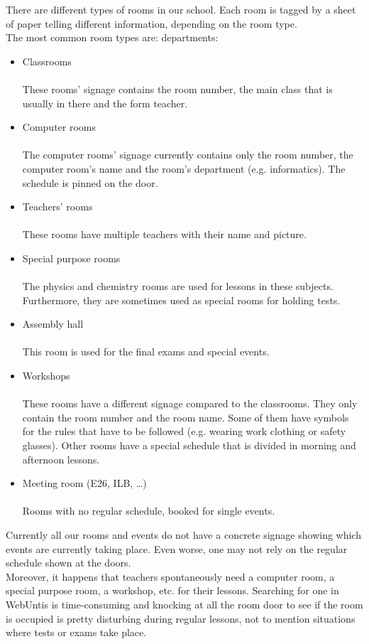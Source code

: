 \documentclass{article}
\newenvironment{explanation}{%
   \color{black}
}{}
\begin{document}
\begin{explanation}
There are different types of rooms in our school. Each room is tagged by a sheet of paper telling different information, depending on the room type.\\
The most common room types are:
departments: 
\begin{itemize}
  \item	Classrooms \\
  \\
  These rooms’ signage contains the room number, the main class that is usually in there and the form teacher.
  \item Computer rooms \\
  \\
  The computer rooms’ signage currently contains only the room number, the computer room’s name and the room’s department (e.g. informatics). The schedule is pinned on the door.
  \item	Teachers’ rooms \\
  \\
  These rooms have multiple teachers with their name and picture.
  \item	Special purpose rooms \\
  \\
  The physics and chemistry rooms are used for lessons in these subjects. Furthermore, they are sometimes used as special rooms for holding tests.
  \item	Assembly hall \\
  \\
  This room is used for the final exams and special events.
  \item	Workshops \\
  \\
  These rooms have a different signage compared to the classrooms. They only contain the room number and the room name. Some of them have symbols for the rules that have to be followed (e.g. wearing work clothing or safety glasses). Other rooms have a special schedule that is divided in morning and afternoon lessons. 
  \item	Meeting room (E26, ILB, …) \\
  \\
  Rooms with no regular schedule, booked for single events.
  \\
\end{itemize}

Currently all our rooms and events do not have a concrete signage showing which events are currently taking place. Even worse, one may not rely on the regular schedule shown at the doors.\\
Moreover, it happens that teachers spontaneously need a computer room, a special purpose room, a workshop, etc. for their lessons. Searching for one in WebUntis is time-consuming and knocking at all the room door to see if the room is occupied is pretty disturbing during regular lessons, not to mention situations where tests or exams take place. 
\end{explanation}
\pagebreak
\end{document}
